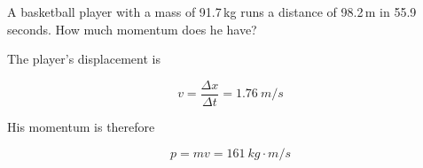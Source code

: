 \documentclass[answers]{exam}
\begin{document}
\begin{questions}



\question %
A basketball player with a mass of 91.7\,kg runs a distance of 98.2\,m in 55.9 seconds.  How much momentum does he have?

\begin{solution}
The player's displacement is

\begin{equation*}
    v = \frac{\Delta x}{\Delta t} = {\SI{1.76}{m/s}}
\end{equation*}

His momentum is therefore

\begin{equation*}
    p = mv = \boxed{\SI{161}{kg\cdot m/s}}
\end{equation*}
\end{solution}












\end{questions}
\end{document}
